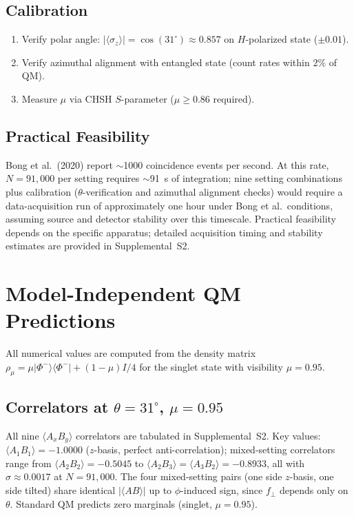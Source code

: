 \documentclass[twocolumn,aps,pra,superscriptaddress,floatfix,10pt]{revtex4-2}
\begin{document}
\subsection{Calibration}
\label{sec:calibration}

\begin{enumerate}
\item Verify polar angle: $|\langle\sigma_z\rangle| = \cos(31^\circ) \approx 0.857$ on $H$-polarized state ($\pm 0.01$).
\item Verify azimuthal alignment with entangled state (count rates within $2\%$ of QM).
\item Measure $\mu$ via CHSH $S$-parameter ($\mu \ge 0.86$ required).
\end{enumerate}

\subsection{Practical Feasibility}
\label{sec:feasibility}

Bong et al.\ (2020) report $\sim$1000 coincidence events per second. At this rate,
$N = 91{,}000$ per setting requires $\sim$91~s of integration; nine setting
combinations plus calibration ($\theta$-verification and azimuthal alignment checks)
would require a data-acquisition run of approximately one hour under Bong
et al.\ conditions, assuming source and detector stability over this timescale.
Practical feasibility depends on the specific apparatus; detailed acquisition
timing and stability estimates are provided in Supplemental~S2.

\section{Model-Independent QM Predictions}
\label{sec:predictions}

All numerical values are computed from the density matrix
$\rho_\mu = \mu|\Phi^-\rangle\langle\Phi^-| + (1-\mu)I/4$ for the
singlet state with visibility $\mu = 0.95$.

\subsection{Correlators at $\theta = 31^\circ$, $\mu = 0.95$}
\label{sec:correlators}

All nine $\langle A_x B_y\rangle$ correlators are tabulated in Supplemental~S2. Key values:
$\langle A_1 B_1\rangle = -1.0000$ ($z$-basis, perfect anti-correlation); mixed-setting correlators
range from $\langle A_2 B_2\rangle = -0.5045$ to $\langle A_2 B_3\rangle = \langle A_3 B_2\rangle = -0.8933$, all with
$\sigma \approx 0.0017$ at $N = 91{,}000$. The four mixed-setting pairs (one side $z$-basis,
one side tilted) share identical $|\langle AB\rangle|$ up to $\phi$-induced sign, since $f_\perp$
depends only on $\theta$. Standard QM predicts zero marginals (singlet, $\mu = 0.95$).
\end{document}
